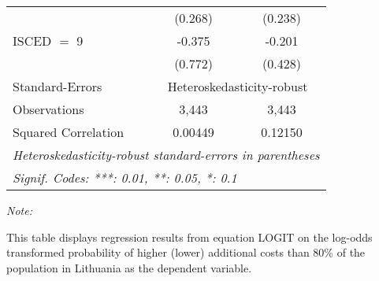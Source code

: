 \begin{table}[htbp!]
\begin{adjustbox}{width = 1\textwidth, max height = 0.95\textheight, center}
\begin{threeparttable}[b]
\begin{tabular}{lcc}
                                 & (0.268)      & (0.238)\\   
            ISCED $=$ 9          & -0.375       & -0.201\\   
                                 & (0.772)      & (0.428)\\   
            \midrule 
            Standard-Errors & \multicolumn{2}{c}{Heteroskedasticity-robust} \\ 
            Observations         & 3,443        & 3,443\\  
            Squared Correlation  & 0.00449      & 0.12150\\  
            \midrule \midrule
            \multicolumn{3}{l}{\emph{Heteroskedasticity-robust standard-errors in parentheses}}\\
            \multicolumn{3}{l}{\emph{Signif. Codes: ***: 0.01, **: 0.05, *: 0.1}}\\
         \end{tabular}
         
         \begin{tablenotes}\item \medskip \textit{Note:}
            \item This table displays regression results from equation LOGIT on the log-odds transformed probability of higher (lower) additional costs than 80\% of the population in Lithuania as the dependent variable. 
         \end{tablenotes}
      \end{threeparttable}
   \end{adjustbox}
\end{table}


